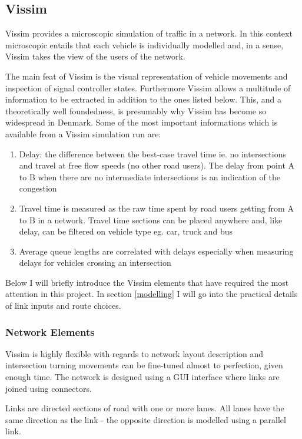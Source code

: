 \subsection*{Vissim}
\label{vissim}
Vissim provides a microscopic simulation of traffic in a network. In this context microscopic entails that each vehicle is individually modelled and, in a sense, Vissim takes the view of the users of the network.

The main feat of Vissim is the visual representation of vehicle movements and inspection of signal controller states. Furthermore Vissim allows a multitude of information to be extracted in addition to the ones listed below. This, and a theoretically well foundedness, is presumably why Vissim has become so widespread in Denmark. Some of the most important informations which is available from a Vissim simulation run are:

\begin{enumerate}
\item Delay: the difference between the best-case travel time ie. no intersections and travel at free flow speeds (no other road users). The delay from point A to B when there are no intermediate intersections is an indication of the congestion
\item Travel time is measured as the raw time spent by road users getting from A to B in a network. Travel time sections can be placed anywhere and, like delay, can be filtered on vehicle type eg. car, truck and bus
\item Average queue lengths are correlated with delays especially when measuring delays for vehicles crossing an intersection
\end{enumerate}

Below I will briefly introduce the Vissim elements that have required the most attention in this project. In section \ref{modelling} I will go into the practical details of link inputs and route choices.

\subsubsection*{Network Elements}

Vissim is highly flexible with regards to network layout description and intersection turning movements can be fine-tuned almost to perfection, given enough time. The network is designed using a GUI interface where links are joined using connectors.

Links are directed sections of road with one or more lanes. All lanes have the same direction as the link - the opposite direction is modelled using a parallel link.

